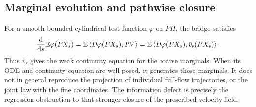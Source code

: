\subsection{Marginal evolution and pathwise closure}
For a smooth bounded cylindrical test function $\varphi$ on $PH$, the bridge satisfies
\begin{equation}
 \frac{\mathrm d}{\mathrm ds}\mathbb E\varphi(PX_s)
 =\mathbb E\left\langle D\varphi(PX_s),PV\right\rangle
 =\mathbb E\left\langle D\varphi(PX_s),\bar v_s(PX_s)\right\rangle.
\end{equation}
Thus $\bar v_s$ gives the weak continuity equation for the coarse marginals. When its ODE and continuity equation are well posed, it generates those marginals. It does not in general reproduce the projection of individual full-flow trajectories, or the joint law with the fine coordinates. The information defect is precisely the regression obstruction to that stronger closure of the prescribed velocity field.
